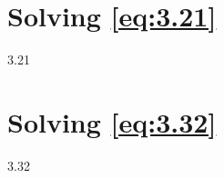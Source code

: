 \label{chapter:app1}


\section{Solving \ref{eq:3.21}}

3.21

\section{Solving \ref{eq:3.32}}

3.32
